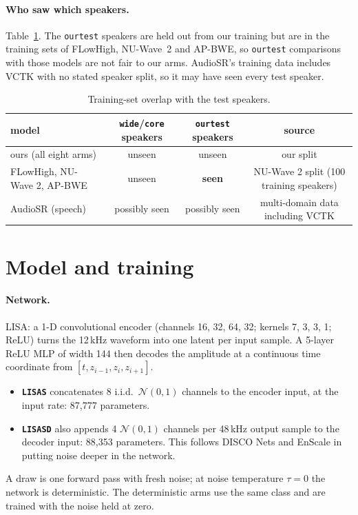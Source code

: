 \documentclass[10pt,letterpaper]{article}
\begin{document}
\paragraph{Who saw which speakers.} Table~\ref{tab:seen}. The \texttt{ourtest} speakers are held out from our
training but are in the training sets of FLowHigh, NU-Wave~2 and AP-BWE, so \texttt{ourtest} comparisons with
those models are not fair to our arms. AudioSR's training data includes VCTK with no stated speaker split, so
it may have seen every test speaker.

\begin{table}[H]\small\centering
\begin{tabular}{lccc}
\toprule
model & \texttt{wide}/\texttt{core} speakers & \texttt{ourtest} speakers & source \\
\midrule
ours (all eight arms) & unseen & unseen & our split \\
FLowHigh, NU-Wave 2, AP-BWE & unseen & \textbf{seen} & NU-Wave 2 split (100 training speakers) \\
AudioSR (speech) & possibly seen & possibly seen & multi-domain data including VCTK \\
\bottomrule
\end{tabular}
\caption{Training-set overlap with the test speakers.}\label{tab:seen}
\end{table}

\section{Model and training}\label{sec:model}

\paragraph{Network.} LISA: a 1-D convolutional encoder (channels 16, 32, 64, 32; kernels 7, 3, 3, 1; ReLU)
turns the 12\,kHz waveform into one latent per input sample. A 5-layer ReLU MLP of width 144 then decodes the
amplitude at a continuous time coordinate from $[t,z_{i-1},z_i,z_{i+1}]$.
\begin{itemize}
\item \textbf{\texttt{LISAS}} concatenates 8 i.i.d.\ $\mathcal N(0,1)$ channels to the encoder input, at the
input rate: 87{,}777 parameters.
\item \textbf{\texttt{LISASD}} also appends 4 $\mathcal N(0,1)$ channels per 48\,kHz output sample to the decoder
input: 88{,}353 parameters. This follows DISCO Nets and EnScale in putting noise deeper in the network.
\end{itemize}
A draw is one forward pass with fresh noise; at noise temperature $\tau=0$ the network is deterministic. The
deterministic arms use the same class and are trained with the noise held at zero.
\end{document}
